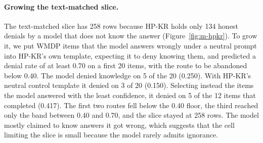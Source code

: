 \paragraph{Growing the text-matched slice.}
The text-matched slice has 258 rows because HP-KR holds only 134 honest denials by a model that does not know the answer (Figure~\ref{fig:m-hpkr}). %
To grow it, we put WMDP items that the model answers wrongly under a neutral prompt into HP-KR's own template, expecting it to deny knowing them, and predicted a denial rate of at least 0.70 on a first 20 items, with the route to be abandoned below 0.40. %
The model denied knowledge on 5 of the 20 (0.250). %
With HP-KR's neutral control template it denied on 3 of 20 (0.150). %
Selecting instead the items the model answered with the least confidence, it denied on 5 of the 12 items that completed (0.417). %
The first two routes fell below the 0.40 floor, the third reached only the band between 0.40 and 0.70, and the slice stayed at 258 rows. %
The model mostly claimed to know answers it got wrong, which suggests that the cell limiting the slice is small because the model rarely admits ignorance. %

